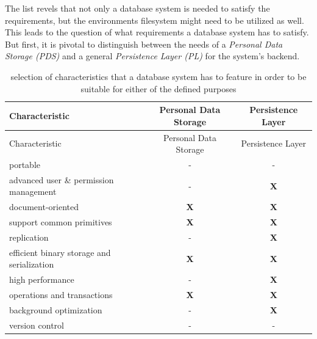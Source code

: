 \documentclass[12pt,english,a4paper,titlepage,cleardoublepage=empty,dottedtoc]{report}
\begin{document}
The list revels that not only a database system is needed to satisfy the
requirements, but the environments filesystem might need to be utilized
as well. This leads to the question of what requirements a database
system has to satisfy. But first, it is pivotal to distinguish between
the needs of a \emph{Personal Data Storage (PDS)} and a general
\emph{Persistence Layer (PL)} for the system's backend.

\begin{longtable}[]{@{}lcc@{}}
\caption{selection of characteristics that a database system has to
feature in order to be suitable for either of the defined purposes
\label{tbl:dbs-features}}\tabularnewline
\toprule
Characteristic & Personal Data Storage & Persistence
Layer\tabularnewline
\midrule
\endfirsthead
\toprule
Characteristic & Personal Data Storage & Persistence
Layer\tabularnewline
\midrule
\endhead
portable & - & -\tabularnewline
advanced user \& permission management & - & \textbf{X}\tabularnewline
document-oriented & \textbf{X} & \textbf{X}\tabularnewline
support common primitives & \textbf{X} & \textbf{X}\tabularnewline
replication & - & \textbf{X}\tabularnewline
efficient binary storage and serialization & \textbf{X} &
\textbf{X}\tabularnewline
high performance & - & \textbf{X}\tabularnewline
operations and transactions & \textbf{X} & \textbf{X}\tabularnewline
background optimization & - & \textbf{X}\tabularnewline
version control & - & -\tabularnewline
\bottomrule
\end{longtable}
\end{document}
